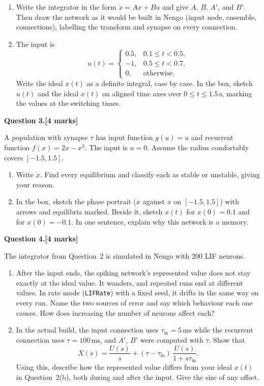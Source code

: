 \documentclass[11pt,letterpaper]{article}
\newcommand{\tin}{\tau_{\mathrm{in}}}
\newcommand{\question}[2]{\par\vspace{10pt}\textbf{Question #1.}\hfill\textbf{[#2 marks]}\par}
\newcommand{\answerbox}[1]{\par\noindent\framebox[\linewidth]{\rule{0pt}{#1}}\par}
\begin{document}
\begin{enumerate}
\item Write the integrator in the form $\dot x = Ax + Bu$ and give $A$, $B$, $A'$, and $B'$. Then draw the network as it would be built in Nengo (input node, ensemble, connections), labelling the transform and synapse on every connection.
\answerbox{5.2cm}
\item The input is
\[
u(t) = \begin{cases} 0.5, & 0.1 \le t < 0.5,\\ -1, & 0.5 \le t < 0.7,\\ 0, & \text{otherwise.} \end{cases}
\]
Write the ideal $x(t)$ as a definite integral, case by case. In the box, sketch $u(t)$ and the ideal $x(t)$ on aligned time axes over $0 \le t \le 1.5\,\mathrm{s}$, marking the values at the switching times.
\answerbox{6.4cm}
\end{enumerate}

\newpage
\question{3}{4}
A population with synapse $\tau$ has input function $g(u) = u$ and recurrent function $f(x) = 2x - x^3$. The input is $u = 0$. Assume the radius comfortably covers $[-1.5, 1.5]$.

\begin{enumerate}
\item Write $\dot x$. Find every equilibrium and classify each as stable or unstable, giving your reason.
\answerbox{4.4cm}
\item In the box, sketch the phase portrait ($\dot x$ against $x$ on $[-1.5, 1.5]$) with arrows and equilibria marked. Beside it, sketch $x(t)$ for $x(0) = 0.1$ and for $x(0) = -0.1$. In one sentence, explain why this network is a memory.
\answerbox{6.2cm}
\end{enumerate}

\newpage
\question{4}{4}
The integrator from Question~2 is simulated in Nengo with $200$ LIF neurons.

\begin{enumerate}
\item After the input ends, the spiking network's represented value does not stay exactly at the ideal value. It wanders, and repeated runs end at different values. In rate mode (\texttt{LIFRate}) with a fixed seed, it drifts in the same way on every run. Name the two sources of error and say which behaviour each one causes. How does increasing the number of neurons affect each?
\answerbox{4.6cm}
\item In the actual build, the input connection uses $\tin = 5\,\mathrm{ms}$ while the recurrent connection uses $\tau = 100\,\mathrm{ms}$, and $A'$, $B'$ were computed with $\tau$. Show that
\[
X(s) = \frac{U(s)}{s} + (\tau - \tin)\,\frac{U(s)}{1 + s\tin}.
\]
Using this, describe how the represented value differs from your ideal $x(t)$ in Question~2(b), both during and after the input. Give the size of any offset.
\answerbox{5.6cm}
\end{enumerate}
\end{document}
